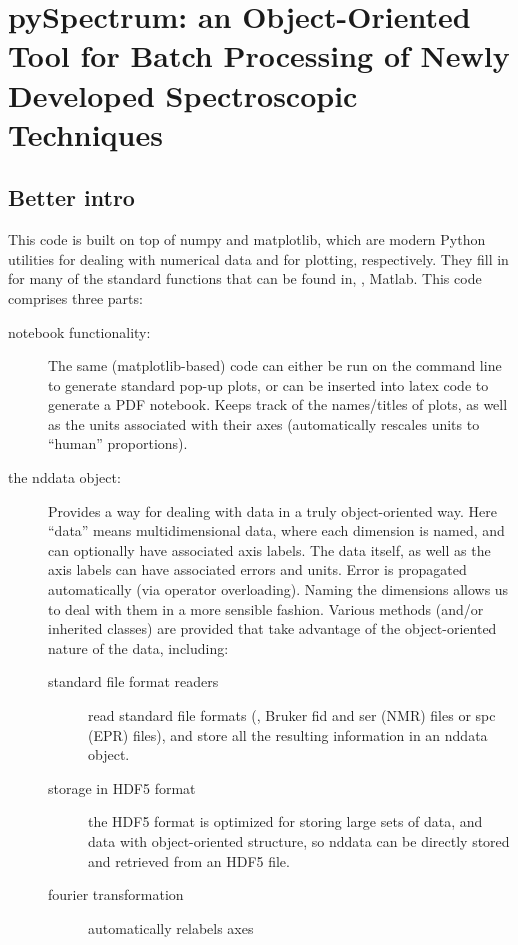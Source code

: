 \chapter{pySpectrum: an Object-Oriented Tool for Batch Processing of Newly Developed Spectroscopic Techniques}
\section{Better intro}
This code is built on top of numpy and matplotlib, which are modern Python utilities for dealing with numerical data and for plotting, respectively.
They fill in for many of the standard functions that can be found in, \eg, Matlab.
This code comprises three parts:
\begin{description}
    \item[notebook functionality:]
        The same (matplotlib-based) code can either be run on the command line
        to generate standard pop-up plots,
        or can be inserted into latex code to generate a PDF notebook.
        Keeps track of the names/titles of plots, as well as the units
        associated with their axes (automatically rescales units to ``human''
        proportions).
    \item[the nddata object:]  
        Provides a way for dealing with data in a truly object-oriented way.
        Here ``data'' means multidimensional data,
        where each dimension is named,
        and can optionally have associated axis labels.
        The data itself, as well as the axis labels can have associated errors
        and units.
        Error is propagated automatically (via operator overloading).
        Naming the dimensions allows us to deal with them in a more sensible
        fashion.
        Various methods (and/or inherited classes) are provided 
        that take advantage of the object-oriented nature of the data, including:
        \begin{description}
            \item[standard file format readers] read standard file formats (\eg,
                Bruker fid and ser (NMR) files or spc (EPR) files),
                and store all the resulting information in an nddata object.
            \item[storage in HDF5 format] the HDF5 format is optimized for storing large sets of data, and data with object-oriented structure, so nddata can be directly stored and retrieved from an HDF5 file. 
            \item[fourier transformation] automatically relabels axes 

\end{description}
\end{description}
